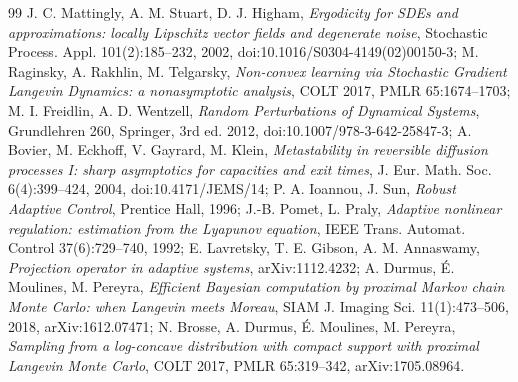\begin{thebibliography}{99}
J. C. Mattingly, A. M. Stuart, D. J. Higham, \emph{Ergodicity for SDEs and approximations: locally Lipschitz vector
fields and degenerate noise}, Stochastic Process. Appl. 101(2):185--232, 2002, doi:10.1016/S0304-4149(02)00150-3;
M. Raginsky, A. Rakhlin, M. Telgarsky, \emph{Non-convex learning via Stochastic Gradient Langevin Dynamics: a
nonasymptotic analysis}, COLT 2017, PMLR 65:1674--1703;
M. I. Freidlin, A. D. Wentzell, \emph{Random Perturbations of Dynamical Systems}, Grundlehren 260, Springer, 3rd ed.
2012, doi:10.1007/978-3-642-25847-3;
A. Bovier, M. Eckhoff, V. Gayrard, M. Klein, \emph{Metastability in reversible diffusion processes I: sharp asymptotics
for capacities and exit times}, J. Eur. Math. Soc. 6(4):399--424, 2004, doi:10.4171/JEMS/14;
P. A. Ioannou, J. Sun, \emph{Robust Adaptive Control}, Prentice Hall, 1996;
J.-B. Pomet, L. Praly, \emph{Adaptive nonlinear regulation: estimation from the Lyapunov equation}, IEEE Trans.
Automat. Control 37(6):729--740, 1992;
E. Lavretsky, T. E. Gibson, A. M. Annaswamy, \emph{Projection operator in adaptive systems}, arXiv:1112.4232;
A. Durmus, \'E. Moulines, M. Pereyra, \emph{Efficient Bayesian computation by proximal Markov chain Monte Carlo: when
Langevin meets Moreau}, SIAM J. Imaging Sci. 11(1):473--506, 2018, arXiv:1612.07471;
N. Brosse, A. Durmus, \'E. Moulines, M. Pereyra, \emph{Sampling from a log-concave distribution with compact support
with proximal Langevin Monte Carlo}, COLT 2017, PMLR 65:319--342, arXiv:1705.08964.


\end{thebibliography}
